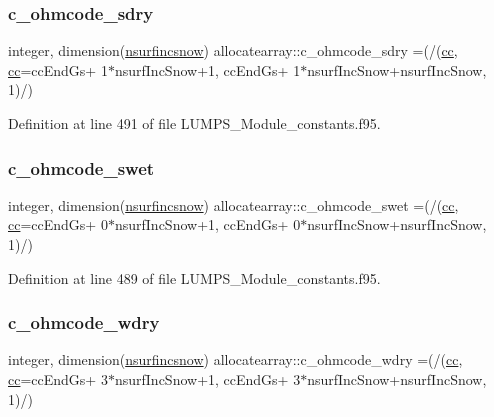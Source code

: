 \subsubsection{\texorpdfstring{c\+\_\+ohmcode\+\_\+sdry}{c\_ohmcode\_sdry}}
{\footnotesize\ttfamily integer, dimension(\hyperlink{namespaceallocatearray_af4d113f332b6759cfa22271140c9162d}{nsurfincsnow}) allocatearray\+::c\+\_\+ohmcode\+\_\+sdry =(/(\hyperlink{namespaceallocatearray_ac863c81704eb507dee10f5e10741e10c}{cc}, \hyperlink{namespaceallocatearray_ac863c81704eb507dee10f5e10741e10c}{cc}=cc\+End\+Gs+ 1$\ast$nsurf\+Inc\+Snow+1, cc\+End\+Gs+ 1$\ast$nsurf\+Inc\+Snow+nsurf\+Inc\+Snow, 1)/)}



Definition at line 491 of file L\+U\+M\+P\+S\+\_\+\+Module\+\_\+constants.\+f95.

\mbox{\label{namespaceallocatearray_a2b9b6b72c78faf563c2341e3e9d5e93d}} 
\subsubsection{\texorpdfstring{c\+\_\+ohmcode\+\_\+swet}{c\_ohmcode\_swet}}
{\footnotesize\ttfamily integer, dimension(\hyperlink{namespaceallocatearray_af4d113f332b6759cfa22271140c9162d}{nsurfincsnow}) allocatearray\+::c\+\_\+ohmcode\+\_\+swet =(/(\hyperlink{namespaceallocatearray_ac863c81704eb507dee10f5e10741e10c}{cc}, \hyperlink{namespaceallocatearray_ac863c81704eb507dee10f5e10741e10c}{cc}=cc\+End\+Gs+ 0$\ast$nsurf\+Inc\+Snow+1, cc\+End\+Gs+ 0$\ast$nsurf\+Inc\+Snow+nsurf\+Inc\+Snow, 1)/)}



Definition at line 489 of file L\+U\+M\+P\+S\+\_\+\+Module\+\_\+constants.\+f95.

\mbox{\label{namespaceallocatearray_a7021ab6b2b0a892263e2bea80216dd42}} 
\subsubsection{\texorpdfstring{c\+\_\+ohmcode\+\_\+wdry}{c\_ohmcode\_wdry}}
{\footnotesize\ttfamily integer, dimension(\hyperlink{namespaceallocatearray_af4d113f332b6759cfa22271140c9162d}{nsurfincsnow}) allocatearray\+::c\+\_\+ohmcode\+\_\+wdry =(/(\hyperlink{namespaceallocatearray_ac863c81704eb507dee10f5e10741e10c}{cc}, \hyperlink{namespaceallocatearray_ac863c81704eb507dee10f5e10741e10c}{cc}=cc\+End\+Gs+ 3$\ast$nsurf\+Inc\+Snow+1, cc\+End\+Gs+ 3$\ast$nsurf\+Inc\+Snow+nsurf\+Inc\+Snow, 1)/)}



